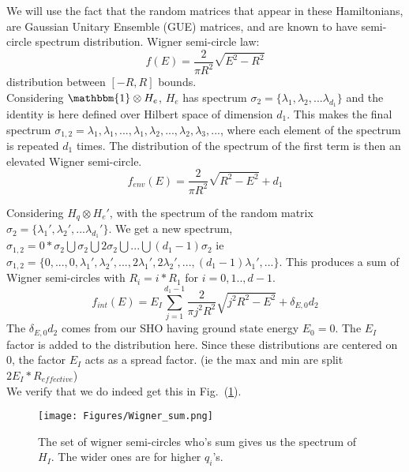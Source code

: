 \documentclass{article}
\begin{document}
We will use the fact that the random matrices that appear in these Hamiltonians, are Gaussian Unitary Ensemble (GUE) matrices, and are known to have semi-circle spectrum distribution.
Wigner semi-circle law:
\begin{equation}
    f(E)=\frac{2}{\pi R^2}\sqrt{E^2-R^2}
\end{equation}
distribution between $[-R,R]$ bounds.\\

Considering $\mathbbm{1}\otimes H_{e}$, $H_{e}$ has spectrum $\sigma_2=\{\lambda_1,\lambda_2,...\lambda_{d_1}\}$ and the identity is here defined over Hilbert space of dimension $d_1$. This makes  the final spectrum $\sigma_{1,2}={\lambda_1, \lambda_1, ..., \lambda_1, \lambda_2, ...,\lambda_2, \lambda_3, ...}$, where each element of the spectrum is repeated $d_1$ times. The distribution of the spectrum of the first term is then an elevated Wigner semi-circle.
\begin{equation}
    f_{env}(E) = \frac{2}{\pi R^2}\sqrt{R^2-E^2} + d_1
\end{equation}

Considering $H_q\otimes H_{e}'$, with the spectrum of the random matrix $\sigma_2=\{\lambda_1',\lambda_2',...\lambda_{d_1}'\}$. We get a new spectrum,  $\sigma_{1,2}=0*\sigma_2\bigcup\sigma_2\bigcup2\sigma_2\bigcup ...\bigcup(d_1-1)\sigma_2$ ie $\sigma_{1,2}= \{0,...,0,\lambda_1', \lambda_2', ..., 2\lambda_1', 2\lambda_2',..., (d_1-1)\lambda_1',...\}$. This produces a sum of Wigner semi-circles with $R_i=i*R_1$ for $i=0,1..,d-1$.
\begin{equation}
    f_{int}(E) = E_I\sum_{j=1}^{d_1-1}\frac{2}{\pi j^2R^2}\sqrt{j^2R^2-E^2} + \delta_{E,0}d_2
\end{equation}
The $\delta_{E,0}d_2$ comes from our SHO having ground state energy $E_0=0$. The $E_I$ factor is added to the distribution here. Since these distributions are centered on 0, the factor $E_I$ acts as a spread factor. (ie the max and min are split $2E_I*R_{effective}$)\\

We verify that we do indeed get this in Fig.~(\ref{fig:wigner_sum}). 

\begin{figure}[h]
    \centering
    \texttt{[image: Figures/Wigner\_sum.png]}
    \caption{The set of wigner semi-circles who's sum gives us the spectrum of $H_I$. The wider ones are for higher $q_i$'s.}
    \label{fig:wigner_sum}
\end{figure}
\end{document}
